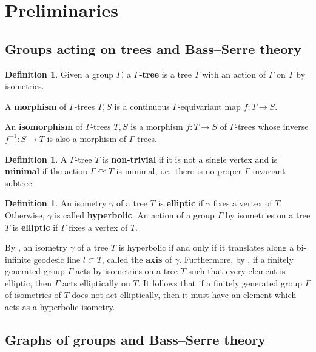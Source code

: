 \documentclass{amsart}
\theoremstyle{plain}
\theoremstyle{definition}
\newtheorem{defn}[thm]{Definition}
\theoremstyle{remark}
\begin{document}
\section{Preliminaries}

\subsection{Groups acting on trees and Bass--Serre theory}

\begin{defn}
    Given a group $\Gamma$, a \textbf{$\Gamma$-tree} is a tree $T$ with an action of $\Gamma$ on $T$ by isometries.

    A \textbf{morphism} of $\Gamma$-trees $T,S$ is a continuous $\Gamma$-equivariant map $f : T \to S$.

    An \textbf{isomorphism} of $\Gamma$-trees $T,S$ is a morphism $f : T \to S$ of $\Gamma$-trees whose inverse $f^{-1} : S \to T$ is also a morphism of $\Gamma$-trees. 
\end{defn}

\begin{defn}
    A $\Gamma$-tree $T$ is \textbf{non-trivial} if it is not a single vertex and is \textbf{minimal} if the action $\Gamma \curvearrowright T$ is minimal, i.e.\ there is no proper $\Gamma$-invariant subtree. 
\end{defn}

\begin{defn}
    An isometry $\gamma$ of a tree $T$ is \textbf{elliptic} if $\gamma$ fixes a vertex of $T$. Otherwise, $\gamma$ is called \textbf{hyperbolic}. 
    An action of a group $\Gamma$ by isometries on a tree $T$ is \textbf{elliptic} if $\Gamma$ fixes a vertex of $T$.
\end{defn}

By \cite[Theorem 2.1(2)]{Introduction_to_group_theory}, an isometry $\gamma$ of a tree $T$ is hyperbolic if and only if it translates along a bi-infinite geodesic line $l \subset T$, called the \textbf{axis} of $\gamma$. Furthermore, by \cite[Proposition 2.5]{Introduction_to_group_theory}, if a finitely generated group $\Gamma$ acts by isometries on a tree $T$ such that every element is elliptic, then $\Gamma$ acts elliptically on $T$. It follows that if a finitely generated group $\Gamma$ of isometries of $T$ does not act elliptically, then it must have an element which acts as a hyperbolic isometry. 

\subsection{Graphs of groups and Bass--Serre theory}
\end{document}
